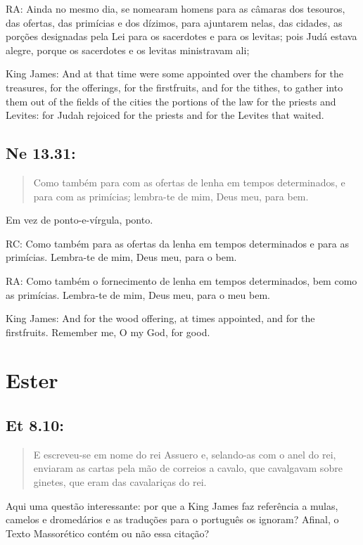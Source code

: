 RA: Ainda no mesmo dia, se nomearam homens para as câmaras dos tesouros, das ofertas, das primícias e dos dízimos, para ajuntarem nelas, das cidades, as porções designadas pela Lei para os sacerdotes e para os levitas; pois Judá estava alegre, porque os sacerdotes e os levitas ministravam ali;

King James: And at that time were some appointed over the chambers for the treasures, for the offerings, for the firstfruits, and for the tithes, to gather into them out of the fields of the cities the portions of the law for the priests and Levites: for Judah rejoiced for the priests and for the Levites that waited.

\subsection*{Ne 13.31:} 
 \begin{quote}
    \small
Como também para com as ofertas de lenha em tempos determinados, e para com as primícias\uline{;} lembra-te de mim, Deus meu, para bem.
\end{quote}

Em vez de ponto-e-vírgula, ponto.

RC: Como também para as ofertas da lenha em tempos determinados e para as primícias. Lembra-te de mim, Deus meu, para o bem.

RA: Como também o fornecimento de lenha em tempos determinados, bem como as primícias. Lembra-te de mim, Deus meu, para o meu bem.

King James: And for the wood offering, at times appointed, and for the firstfruits. Remember me, O my God, for good.

\section{Ester}
\subsection*{Et 8.10:} 
 \begin{quote}
    \small
E escreveu-se em nome do rei Assuero e, selando-as com o anel do rei, enviaram as cartas pela mão de correios a cavalo, que cavalgavam sobre ginetes, que eram das cavalariças do rei.
\end{quote}

Aqui uma questão interessante: por que a King James faz referência a
mulas, camelos e dromedários e as traduções para o português os
ignoram? Afinal, o Texto Massorético contém ou não essa citação?

